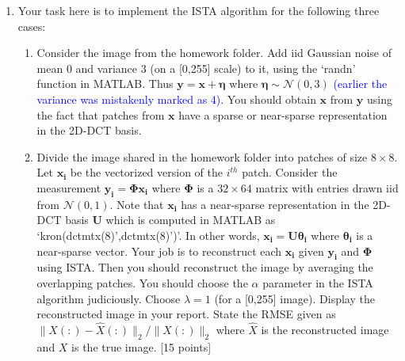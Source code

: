 \documentclass[11pt]{article}
\begin{document}
\begin{enumerate}
\item Your task here is to implement the ISTA algorithm for the following three cases:
\begin{enumerate}
\item Consider the image from the homework folder. Add iid Gaussian noise of mean 0 and variance 3 (on a [0,255] scale) to it, using the `randn' function in MATLAB. Thus $\boldsymbol{y} = \boldsymbol{x} + \boldsymbol{\eta}$ where $\boldsymbol{\eta} \sim \mathcal{N}(0,3)$ \textcolor{blue}{(earlier the variance was mistakenly marked as 4)}. You should obtain $\boldsymbol{x}$ from $\boldsymbol{y}$ using the fact that patches from $\boldsymbol{x}$ have a sparse or near-sparse representation in the 2D-DCT basis. 
\item Divide the image shared in the homework folder into patches of size $8 \times 8$. Let $\boldsymbol{x_i}$ be the vectorized version of the $i^{th}$ patch. Consider the measurement $\boldsymbol{y_i} = \boldsymbol{\Phi x_i}$ where $\boldsymbol{\Phi}$ is a $32 \times 64$ matrix with entries drawn iid from $\mathcal{N}(0,1)$. Note that $\boldsymbol{x_i}$ has a near-sparse representation in the 2D-DCT basis $\boldsymbol{U}$ which is computed in MATLAB as `kron(dctmtx(8)',dctmtx(8)')'. In other words, $\boldsymbol{x_i} = \boldsymbol{U \theta_i}$ where $\boldsymbol{\theta_i}$ is a near-sparse vector. Your job is to reconstruct each $\boldsymbol{x_i}$ given $\boldsymbol{y_i}$ and $\boldsymbol{\Phi}$ using ISTA. Then you should reconstruct the image by averaging the overlapping patches. You should choose the $\alpha$ parameter in the ISTA algorithm judiciously. Choose $\lambda = 1$ (for a [0,255] image). Display the reconstructed image in your report. State the RMSE given as $\|X(:)-\hat{X}(:)\|_2/\|X(:)\|_2$ where $\hat{X}$ is the reconstructed image and $X$ is the true image. \textsf{[15 points]}
\end{enumerate}


\end{enumerate}
\end{document}
